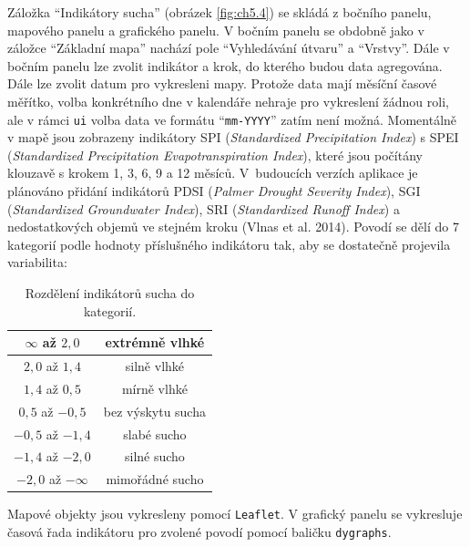\documentclass[12pt,]{article}
\begin{document}
\vspace*{-0.3cm}

\qquad Záložka \enquote{Indikátory sucha} (obrázek \ref{fig:ch5.4}) se
skládá z bočního panelu, mapového panelu a grafického panelu. V bočním
panelu se obdobně jako v záložce \enquote{Základní mapa} nachází pole
\enquote{Vyhledávání útvaru} a \enquote{Vrstvy}. Dále v bočním panelu
lze zvolit indikátor a krok, do kterého budou data agregována. Dále lze
zvolit datum pro vykresleni mapy. Protože data mají měsíční časové
měřítko, volba konkrétního dne v kalendáře nehraje pro vykreslení žádnou
roli, ale v rámci \texttt{ui} volba data ve formátu
\enquote{\texttt{mm-YYYY}} zatím není možná. Momentálně v mapě jsou
zobrazeny indikátory SPI (\emph{Standardized Precipitation Index}) s
SPEI (\emph{Standardized Precipitation Evapotranspiration Index}), které
jsou počítány klouzavě s krokem 1, 3, 6, 9 a 12 měsíců. V~budoucích
verzích aplikace je plánováno přidání indikátorů PDSI (\emph{Palmer
Drought Severity Index}), SGI (\emph{Standardized Groundwater Index}),
SRI (\emph{Standardized Runoff Index}) a nedostatkových objemů ve
stejném kroku (Vlnas et al. 2014). Povodí se dělí do 7 kategorií podle
hodnoty příslušného indikátoru tak, aby se dostatečně projevila
variabilita:

\begin{table}[H]
\centering
\begin{tabular}{|c|c|}
\hline
$\infty$ až $2,0$   & extrémně vlhké    \\ \hline
$2,0$ až $1,4$      & silně vlhké       \\ \hline
$1,4$ až $0,5$      & mírně vlhké       \\ \hline
$0,5$ až $-0,5$     & bez výskytu sucha \\ \hline
$-0,5$ až $-1,4$    & slabé sucho       \\ \hline
$-1,4$ až $-2,0$    & silné sucho       \\ \hline
$-2,0$ až $-\infty$ & mimořádné sucho   \\ \hline
\end{tabular}
\caption{Rozdělení indikátorů sucha do kategorií.}
\label{tab9}
\end{table}

\vspace*{-0.3cm}

\qquad Mapové objekty jsou vykresleny pomocí \texttt{Leaflet}. V
grafický panelu se vykresluje časová řada indikátoru pro zvolené povodí
pomocí baličku \texttt{dygraphs}.
\end{document}
